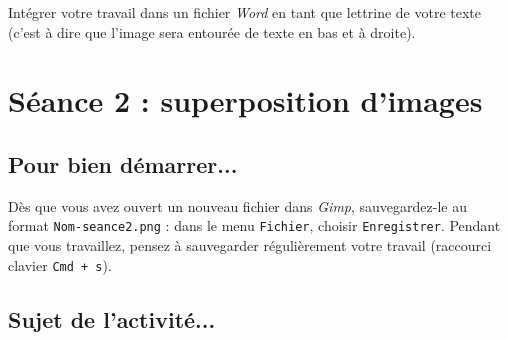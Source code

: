 Intégrer votre travail dans un fichier \emph{Word} en tant que lettrine de votre texte (c'est à dire que l'image sera entourée de texte en bas et à droite). 








%
%
%
%

\newpage

\section{Séance 2 : superposition d'images}\label{ficheImage5e2}

\subsection{Pour bien démarrer...}

Dès que vous avez ouvert un nouveau fichier dans \emph{Gimp}, sauvegardez-le au format \texttt{Nom-seance2.png} : dans le menu \texttt{Fichier}, choisir \texttt{Enregistrer}. Pendant que vous travaillez, pensez à sauvegarder régulièrement votre travail (raccourci clavier \texttt{Cmd + s}).   




\subsection{Sujet de l'activité...}

\vspace{10pt}

